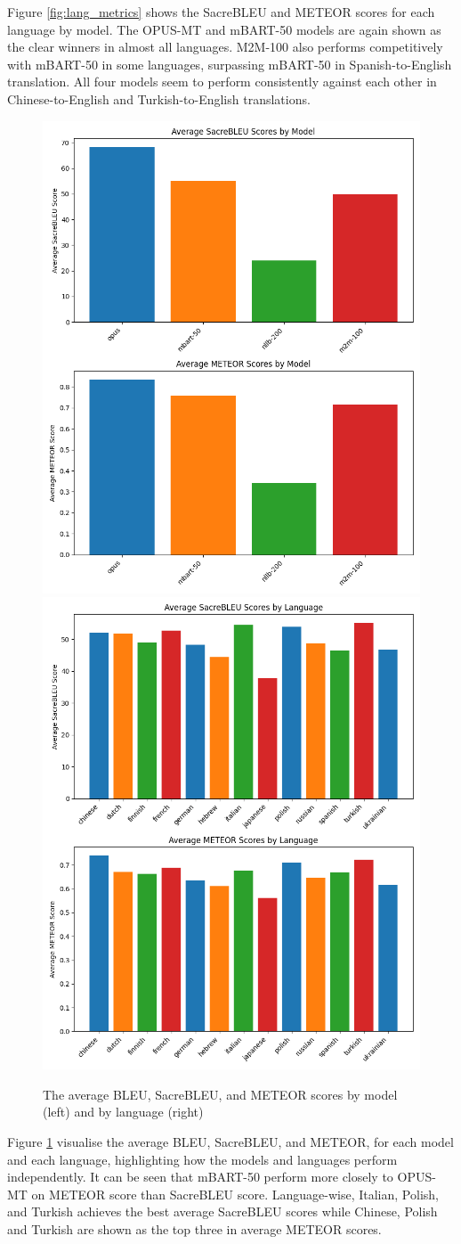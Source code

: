 \documentclass[a4paper]{article}
\begin{document}
Figure \ref{fig:lang_metrics} shows the SacreBLEU and METEOR scores for each language by model. The OPUS-MT and mBART-50 models are again shown as the clear winners in almost all languages. M2M-100 also performs competitively with mBART-50 in some languages, surpassing mBART-50 in Spanish-to-English translation. All four models seem to perform consistently against each other in Chinese-to-English and Turkish-to-English translations.

\begin{figure}[htbp]
    \centering
    \includegraphics[width=0.49\linewidth]{figures/average_metrics_bar.png}
    \includegraphics[width=0.49\linewidth]{figures/average_metrics_lang_bar.png}
    \caption{The average BLEU, SacreBLEU, and METEOR scores by model (left) and by language (right)}
    \label{fig:average_bars}
\end{figure}

Figure \ref{fig:average_bars} visualise the average BLEU, SacreBLEU, and METEOR, for each model and each language, highlighting how the models and languages perform independently. It can be seen that mBART-50 perform more closely to OPUS-MT on METEOR score than SacreBLEU score. Language-wise, Italian, Polish, and Turkish achieves the best average SacreBLEU scores while Chinese, Polish and Turkish are shown as the top three in average METEOR scores.
\end{document}

